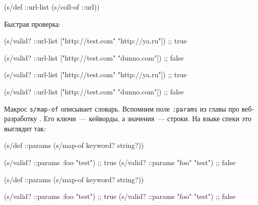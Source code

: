 \begin{english}
  \begin{clojure}
(s/def ::url-list (s/coll-of ::url))
  \end{clojure}
\end{english}

\noindent
Быстрая проверка:

\ifx\devicetype\mobile

\begin{english}
  \begin{clojure}
(s/valid? ::url-list
  ["http://test.com" "http://ya.ru"])
;; true

(s/valid? ::url-list
  ["http://test.com" "dunno.com"])
;; false
  \end{clojure}
\end{english}

\else

\begin{english}
  \begin{clojure}
(s/valid? ::url-list ["http://test.com" "http://ya.ru"])
;; true

(s/valid? ::url-list ["http://test.com" "dunno.com"])
;; false
  \end{clojure}
\end{english}

\fi


Макрос \verb|s/map-of| описывает словарь. Вспомним поле \verb|:params| из
главы про веб-разработку . Его ключи~--- кейворды, а значения~---
строки. На языке спеки это выглядит так:

\ifx\devicetype\mobile

\begin{english}
  \begin{clojure}
(s/def ::params
  (s/map-of keyword? string?))

(s/valid? ::params
  {:foo "test"})  ;; true
(s/valid? ::params
  {"foo" "test"}) ;; false
  \end{clojure}
\end{english}

\else

\begin{english}
  \begin{clojure}
(s/def ::params
  (s/map-of keyword? string?))

(s/valid? ::params {:foo "test"})  ;; true
(s/valid? ::params {"foo" "test"}) ;; false
  \end{clojure}
\end{english}

